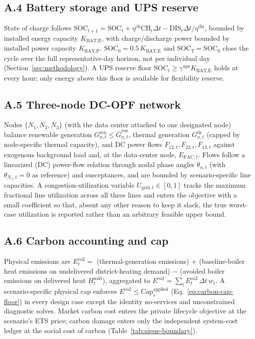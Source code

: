 \documentclass[preprint,12pt]{elsarticle}
\begin{document}
\subsection*{A.4 Battery storage and UPS reserve}
State of charge follows $\text{SOC}_{t+1}=\text{SOC}_t+\eta^{\text{ch}}\text{CH}_t\Delta t-\text{DIS}_t\Delta t/\eta^{\text{dis}}$, bounded by installed energy capacity $K_{\text{BAT,E}}$, with charge/discharge power bounded by installed power capacity $K_{\text{BAT,P}}$. $\text{SOC}_0=0.5\,K_{\text{BAT,E}}$ and $\text{SOC}_T=\text{SOC}_0$ close the cycle over the full representative-day horizon, not per individual day (Section~\ref{sec:methodology}). A UPS reserve floor $\text{SOC}_t \ge \gamma^{\text{ups}} K_{\text{BAT,E}}$ holds at every hour; only energy above this floor is available for flexibility reserve.

\subsection*{A.5 Three-node DC-OPF network}
Nodes $\{N_1,N_2,N_3\}$ (with the data center attached to one designated node) balance renewable generation $G^{\text{ren}}_{n,t}\le\bar{G}^{\text{ren}}_{n,t}$, thermal generation $G^{\text{th}}_{n,t}$ (capped by node-specific thermal capacity), and DC power flows $F_{12,t},F_{23,t},F_{13,t}$ against exogenous background load and, at the data-center node, $E_{\text{FAC},t}$. Flows follow a linearized (DC) power-flow relation through nodal phase angles $\theta_{n,t}$ (with $\theta_{N_1,t}=0$ as reference) and susceptances, and are bounded by scenario-specific line capacities. A congestion-utilization variable $U_{\text{grid},t}\in[0,1]$ tracks the maximum fractional line utilization across all three lines and enters the objective with a small coefficient so that, absent any other reason to keep it slack, the true worst-case utilization is reported rather than an arbitrary feasible upper bound.

\subsection*{A.6 Carbon accounting and cap}
Physical emissions are $E^{\text{co2}}_t=$ (thermal-generation emissions) $+$ (baseline-boiler heat emissions on undelivered district-heating demand) $-$ (avoided boiler emissions on delivered heat $H^{\text{sold}}_t$), aggregated to $E^{\text{co2}}=\sum_t E^{\text{co2}}_t\,\Delta t\, w_t$. A scenario-specific physical cap enforces $E^{\text{co2}}\le \text{Cap}^{\text{applied}}_s$ (Eq.~\ref{eq:carbon-cap-floor}) in every design case except the identity no-services and unconstrained diagnostic solves. Market carbon cost enters the private lifecycle objective at the scenario's ETS price; carbon damage enters only the independent system-cost ledger at the social cost of carbon (Table~\ref{tab:sipue-boundary}).
\end{document}
